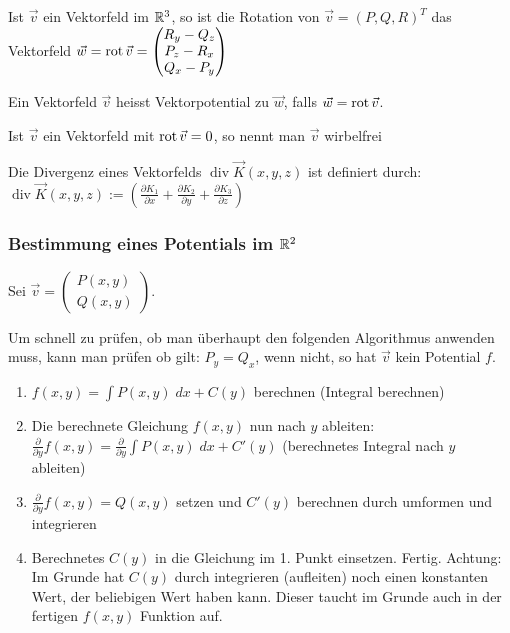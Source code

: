 \begin{definition}
Ist $\vec{v}$ ein Vektorfeld im $\mathbb{R}^3$, so ist die Rotation von $\vec{v} = (P, Q, R)^T$ das Vektorfeld
$\vec{w} = \operatorname{rot} \vec{v} = \begin{pmatrix}
R_y - Q_z\\
P_z - R_x\\
Q_x - P_y
\end{pmatrix}$
\end{definition}

\begin{definition}[Vektorpotential]
Ein Vektorfeld $\vec{v}$ heisst Vektorpotential zu $\vec{w}$, falls $\vec{w} = \operatorname{rot} \vec{v}$.
\end{definition}

\begin{definition}
Ist $\vec{v}$ ein Vektorfeld mit $\operatorname{rot} \vec{v} = 0$, so nennt man $\vec{v}$ wirbelfrei
\end{definition}

\begin{definition}[Divergenz]
Die Divergenz eines Vektorfelds $\operatorname{div} \vec{K}(x,y,z)$ ist definiert durch:
$\operatorname{div} \vec{K}(x,y,z) := \left( \frac{\partial
K_1}{\partial x} + \frac{\partial K_2}{\partial y} + \frac{\partial
K_3}{\partial z} \right)$
\end{definition}

\subsubsection{Bestimmung eines Potentials im $\mathbb{R}^2$}
Sei $\vec{v} = \begin{pmatrix}
P(x,y)\\
Q(x,y)
\end{pmatrix}$.

Um schnell zu prüfen, ob man überhaupt den folgenden Algorithmus anwenden muss,
kann man prüfen ob gilt: $P_y = Q_x$, wenn nicht, so hat $\vec{v}$ kein Potential $f$.

\begin{enumerate}[itemsep=1em]
	\item $f(x,y) = \int P(x,y)\;dx + C(y)$ berechnen (Integral berechnen)
	\item Die berechnete Gleichung $f(x,y)$ nun nach $y$ ableiten:
	$\frac{\partial}{\partial y} f(x,y) = \frac{\partial}{\partial y}\int P(x,y)\;dx + C'(y)$
	(berechnetes Integral nach $y$ ableiten)
	\item $\frac{\partial}{\partial y} f(x,y) = Q(x,y)$ setzen und $C'(y)$ berechnen durch umformen
	und integrieren
	\item Berechnetes $C(y)$ in die Gleichung im 1. Punkt einsetzen. Fertig. Achtung: Im Grunde hat
	$C(y)$ durch integrieren (aufleiten) noch einen konstanten Wert, der beliebigen Wert haben kann.
	Dieser taucht im Grunde auch in der fertigen $f(x,y)$ Funktion auf.
\end{enumerate}

